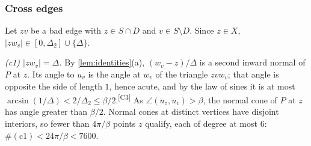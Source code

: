 \documentclass[11pt]{amsart}
\theoremstyle{definition}
\theoremstyle{remark}
\newcommand{\Dt}{\Delta_2}
\newcommand{\chk}[1]{\textsuperscript{[#1]}}
\begin{document}
\subsubsection*{Cross edges}
Let $zv$ be a bad edge with $z\in S\cap D$ and $v\in S\setminus D$. Since $z\in X$, $|zw_v|\in[0,\Dt]\cup\{\Delta\}$.

\emph{(c1) $|zw_v|=\Delta$.} By \cref{lem:identities}(a), $(w_v-z)/\Delta$ is a second inward normal of $P$ at $z$. Its angle to $u_v$ is the angle at $w_v$ of the triangle $zvw_v$; that angle is opposite the side of length $1$, hence acute, and by the law of sines it is at most $\arcsin(1/\Delta)<2/\Dt\le\beta/2$.\chk{C3} As $\angle(u_z,u_v)>\beta$, the normal cone of $P$ at $z$ has angle greater than $\beta/2$. Normal cones at distinct vertices have disjoint interiors, so fewer than $4\pi/\beta$ points $z$ qualify, each of degree at most $6$: $\#(\mathrm{c1})<24\pi/\beta<7600$.
\end{document}
